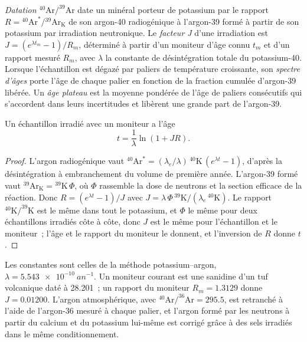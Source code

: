 \begin{definition}
\label{def:b3:advanced-geochronology:arar}
\emph{Datation $^{40}\mathrm{Ar}/^{39}\mathrm{Ar}$}
date un minéral porteur de potassium par le rapport $R =
{}^{40}\mathrm{Ar}^*/{}^{39}\mathrm{Ar}_{\mathrm K}$ de son argon-40 radiogénique
à l'argon-39 formé à partir de son potassium par irradiation neutronique. Le
\emph{facteur J} d'une irradiation est $J = (e^{\lambda
t_m} - 1)/R_m$, déterminé à partir d'un moniteur d'âge connu $t_m$ et d'un rapport mesuré
$R_m$, avec $\lambda$ la constante de désintégration totale du potassium-40. Lorsque
l'échantillon est dégazé par paliers de température croissante, son \emph{spectre
d'âges} porte l'âge de chaque palier en fonction de la
fraction cumulée d'argon-39 libérée. Un \emph{âge
plateau} est la moyenne pondérée de l'âge de paliers consécutifs qui
s'accordent dans leurs incertitudes et libèrent une grande part de l'argon-39.
\end{definition}

\begin{theorem}\label{thm:b3:advanced-geochronology:arar}
Un échantillon irradié avec un moniteur a l'âge
\[
t = \frac1\lambda\ln(1 + JR).
\]
\end{theorem}

\begin{proof}
L'argon radiogénique vaut $^{40}\mathrm{Ar}^* = (\lambda_e/\lambda)\,
{}^{40}\mathrm{K}\,(e^{\lambda t} - 1)$, d'après la désintégration à embranchement du volume de
première année. L'argon-39 formé vaut $^{39}\mathrm{Ar}_{\mathrm K} =
{}^{39}\mathrm{K}\,\Phi$, où $\Phi$ rassemble la dose de neutrons et la
section efficace de la réaction. Donc $R = (e^{\lambda t} - 1)/J$ avec $J =
\lambda\,\Phi\,{}^{39}\mathrm{K}/(\lambda_e\,{}^{40}\mathrm{K})$. Le rapport
$^{40}\mathrm{K}/^{39}\mathrm{K}$ est le même dans tout le potassium, et $\Phi$ le
même pour deux échantillons irradiés côte à côte, donc $J$ est le même pour l'échantillon et le
moniteur~; l'âge et le rapport du moniteur le donnent, et l'inversion de $R$ donne
$t$.
\end{proof}

Les constantes sont celles de la méthode potassium--argon, $\lambda =
\qty{5.543e-10}{an^{-1}}$. Un moniteur courant est une sanidine d'un tuf volcanique
daté à \qty{28.201}{\Ma}~; un rapport du moniteur $R_m = 1.3129$ donne $J =
0.01200$. L'argon atmosphérique, avec $^{40}\mathrm{Ar}/^{36}\mathrm{Ar} = 295.5$,
est retranché à l'aide de l'argon-36 mesuré à chaque palier, et l'argon formé par les
neutrons à partir du calcium et du potassium lui-même est corrigé grâce à des sels
irradiés dans le même conditionnement.

